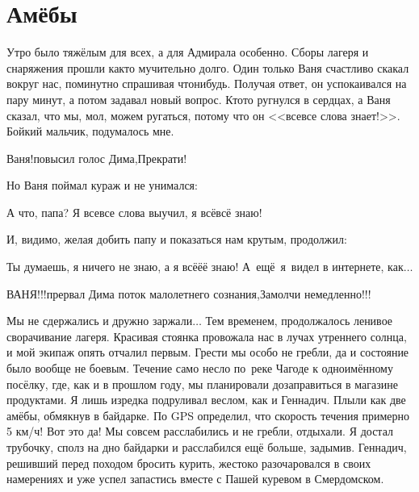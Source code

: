 \chapter{Амёбы} 
\vepsianrose

Утро было тяжёлым для всех, а для Адмирала особенно. Сборы лагеря и снаряжения прошли как\sdash то мучительно долго. Один только Ваня счастливо скакал вокруг нас, поминутно спрашивая что\sdash нибудь. Получая ответ, он успокаивался на пару минут, а потом задавал новый вопрос. Кто\sdash то ругнулся в сердцах, а Ваня сказал, что мы, мол, можем ругаться, потому что он <<все\sdash все слова знает!>>. Бойкий мальчик, подумалось мне. 


\diagdash Ваня!\mdash повысил голос Дима,\mdash Прекрати! 

Но Ваня поймал кураж и не унимался: 

\diagdash А что, папа? Я все\sdash все слова выучил, я всё\sdash всё знаю! 

И, видимо, желая добить папу и показаться нам крутым, продолжил: 

\diagdash Ты думаешь, я ничего не знаю, а я всё\sdash ё\sdash ё знаю! А~ещё~я~видел в интернете, как$\ldots$ 

\diagdash ВАНЯ!!!\mdash прервал Дима поток малолетнего сознания,\mdash Замолчи немедленно!!! 

Мы не сдержались и  дружно заржали$\ldots$ Тем временем, продолжалось ленивое сворачивание лагеря. Красивая стоянка провожала нас в лучах утреннего солнца, и мой экипаж опять отчалил первым. Грести мы особо не гребли, да и состояние было вообще не боевым. Течение само несло по~реке Чагоде к одноимённому посёлку, где, как и в прошлом году, мы планировали дозаправиться в магазине продуктами. Я лишь изредка подруливал веслом, как и Геннадич. Плыли как две амёбы, обмякнув в байдарке. По GPS определил, что скорость течения примерно 5 км/ч! Вот это да! Мы совсем расслабились и не гребли, отдыхали. Я достал трубочку, сполз на дно байдарки и расслабился ещё больше, задымив. Геннадич, решивший перед походом бросить курить, жестоко разочаровался в своих намерениях и уже успел запастись вместе с Пашей куревом в Смердомском.

